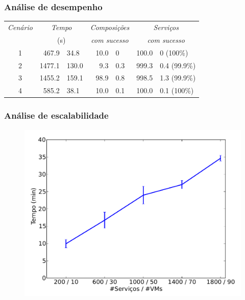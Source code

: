 \documentclass{beamer}
\begin{document}
\begin{frame}
\frametitle{Análise de desempenho}

\begin{table}
\centering
\begin{tabular}{c r@{ $\pm$ }l r@{ $\pm$ }l r@{ $\pm$ }l} \hline

\emph{Cenário} & \multicolumn{2}{c}{\emph{Tempo}} & \multicolumn{2}{c}{\emph{Composições}}   & \multicolumn{2}{c}{\emph{Serviços}}\\
                 & \multicolumn{2}{c}{(s)}           & \multicolumn{2}{c}{\emph{com sucesso}} & \multicolumn{2}{c}{\emph{com sucesso}}\\
\hline
1 &  467.9 &  34.8 & 10.0 & 0   & 100.0 & 0   (100\%) \\
2 & 1477.1 & 130.0 &  9.3 & 0.3 & 999.3 & 0.4 (99.9\%)\\
3 & 1455.2 & 159.1 & 98.9 & 0.8 & 998.5 & 1.3 (99.9\%)\\
4 &  585.2 &  38.1 & 10.0 & 0.1 & 100.0 & 0.1 (100\%)\\
\hline \end{tabular}
\end{table}

\end{frame}


\begin{frame}
\frametitle{Análise de escalabilidade}

\begin{figure}
\includegraphics[width=0.8\linewidth]{img/scalability}
\end{figure}

\end{frame}
\end{document}
